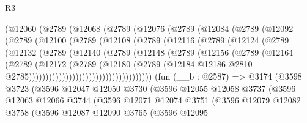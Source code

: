 \begin{lexlean}{R3}
\begin{coremodule}
            (@12060
              (@2789
                (@12068
                  (@2789
                    (@12076
                      (@2789
                        (@12084
                          (@2789
                            (@12092
                              (@2789
                                (@12100
                                  (@2789
                                    (@12108
                                      (@2789
                                        (@12116
                                          (@2789
                                            (@12124
                                              (@2789
                                                (@12132
                                                  (@2789
                                                    (@12140
                                                      (@2789
                                                        (@12148
                                                          (@2789
                                                            (@12156
                                                              (@2789
                                                                (@12164
                                                                  (@2789
                                                                    (@12172
                                                                      (@2789
                                                                        (@12180
                                                                          (@2789
                                                                            (@12184
                                                                              @12186
                                                                              @2810
                                                                              @2785)))))))))))))))))))))))))))))))))))))
    (fun (__b : @2587) =>
    @3174
      (@3598
        @3723
        (@3596
          @12047
          @12050
          @3730
          (@3596
            @12055
            @12058
            @3737
            (@3596
              @12063
              @12066
              @3744
              (@3596
                @12071
                @12074
                @3751
                (@3596
                  @12079
                  @12082
                  @3758
                  (@3596
                    @12087
                    @12090
                    @3765
                    (@3596
                      @12095

\end{coremodule}
\end{lexlean}
